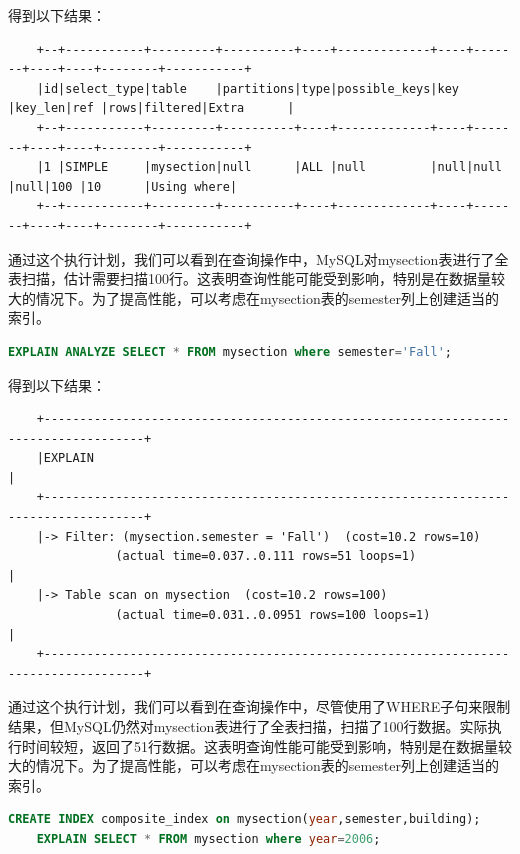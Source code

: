 \documentclass{article}
\begin{document}
	得到以下结果：
	
	\begin{verbatim}
	+--+-----------+---------+----------+----+-------------+----+-------+----+----+--------+-----------+
	|id|select_type|table    |partitions|type|possible_keys|key |key_len|ref |rows|filtered|Extra      |
	+--+-----------+---------+----------+----+-------------+----+-------+----+----+--------+-----------+
	|1 |SIMPLE     |mysection|null      |ALL |null         |null|null   |null|100 |10      |Using where|
	+--+-----------+---------+----------+----+-------------+----+-------+----+----+--------+-----------+
	\end{verbatim}
	
	通过这个执行计划，我们可以看到在查询操作中，MySQL对mysection表进行了全表扫描，估计需要扫描100行。这表明查询性能可能受到影响，特别是在数据量较大的情况下。为了提高性能，可以考虑在mysection表的semester列上创建适当的索引。
	
	\begin{lstlisting}[language=sql, title=索引对查询性能的影响, tabsize=4]
	EXPLAIN ANALYZE SELECT * FROM mysection where semester='Fall';
	\end{lstlisting}
	
	得到以下结果：
	
	\begin{verbatim}
	+------------------------------------------------------------------------------------+
	|EXPLAIN                                                                             |
	+------------------------------------------------------------------------------------+
	|-> Filter: (mysection.semester = 'Fall')  (cost=10.2 rows=10) 
	           (actual time=0.037..0.111 rows=51 loops=1)                                |
	|-> Table scan on mysection  (cost=10.2 rows=100) 
	           (actual time=0.031..0.0951 rows=100 loops=1)                              |
	+------------------------------------------------------------------------------------+
	\end{verbatim}
	
	通过这个执行计划，我们可以看到在查询操作中，尽管使用了WHERE子句来限制结果，但MySQL仍然对mysection表进行了全表扫描，扫描了100行数据。实际执行时间较短，返回了51行数据。这表明查询性能可能受到影响，特别是在数据量较大的情况下。为了提高性能，可以考虑在mysection表的semester列上创建适当的索引。
	
	\begin{lstlisting}[language=sql, title=索引对查询性能的影响, tabsize=4]
	CREATE INDEX composite_index on mysection(year,semester,building);
	EXPLAIN SELECT * FROM mysection where year=2006;
	\end{lstlisting}
	
\end{document}
